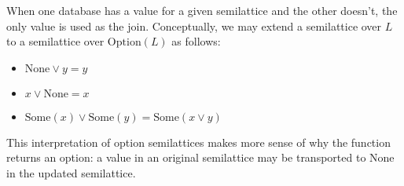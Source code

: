 \documentclass{article}
\begin{document}
    When one database has a value for a given semilattice and the other doesn't, the only value is used as the join. Conceptually, we may extend a semilattice over $L$ to a semilattice over $\mathrm{Option}(L)$ as follows:

    \begin{itemize}
      \item $\mathrm{None} \vee y = y$
      \item $x \vee \mathrm{None} = x$
      \item $\mathrm{Some}(x) \vee \mathrm{Some}(y) = \mathrm{Some}(x \vee y)$
    \end{itemize}

    This interpretation of option semilattices makes more sense of why the \transport function returns an option: a value in an original semilattice may be transported to $\mathrm{None}$ in the updated semilattice.
\end{document}
